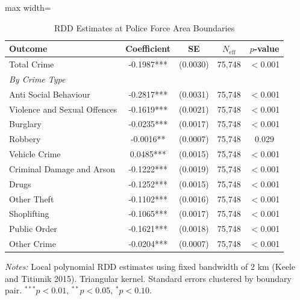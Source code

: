 \begin{table}[htbp]
\centering
\caption{RDD Estimates at Police Force Area Boundaries}
\label{tab:main_rdd}
\begin{adjustbox}{max width=\textwidth}
\begin{tabular}{lcccc}
\toprule
Outcome & Coefficient & SE & $N_{\text{eff}}$ & $p$-value \\
\midrule
Total Crime & -0.1987*** & (0.0030) & 75,748 & $<$0.001 \\
\midrule
\multicolumn{4}{l}{\textit{By Crime Type}} \\
Anti Social Behaviour & -0.2817*** & (0.0031) & 75,748 & $<$0.001 \\
Violence and Sexual Offences & -0.1619*** & (0.0021) & 75,748 & $<$0.001 \\
Burglary & -0.0235*** & (0.0017) & 75,748 & $<$0.001 \\
Robbery & -0.0016** & (0.0007) & 75,748 & 0.029 \\
Vehicle Crime & 0.0485*** & (0.0015) & 75,748 & $<$0.001 \\
Criminal Damage and Arson & -0.1222*** & (0.0019) & 75,748 & $<$0.001 \\
Drugs & -0.1252*** & (0.0015) & 75,748 & $<$0.001 \\
Other Theft & -0.1102*** & (0.0016) & 75,748 & $<$0.001 \\
Shoplifting & -0.1065*** & (0.0017) & 75,748 & $<$0.001 \\
Public Order & -0.1621*** & (0.0018) & 75,748 & $<$0.001 \\
Other Crime & -0.0204*** & (0.0007) & 75,748 & $<$0.001 \\
\bottomrule
\end{tabular}
\end{adjustbox}
\parbox{\textwidth}{\footnotesize \textit{Notes:} Local polynomial RDD estimates using fixed bandwidth of 2 km (Keele and Titiunik 2015). Triangular kernel. Standard errors clustered by boundary pair. $^{***}p<0.01$, $^{**}p<0.05$, $^{*}p<0.10$.}
\end{table}
